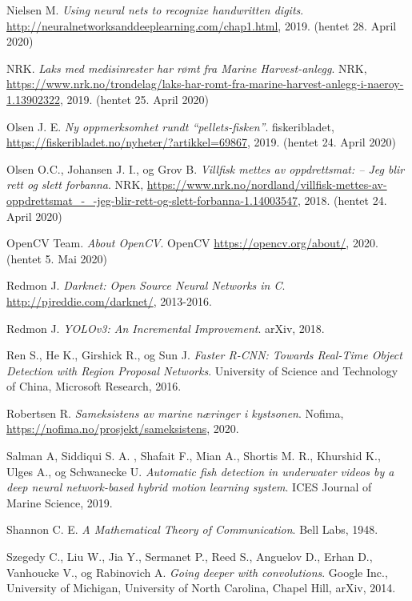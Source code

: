 \documentclass[11ot]{article}
\begin{document}
\begin{thebibliography}{9}
Nielsen M. 
\textit{Using neural nets to recognize handwritten digits}. 
\url{http://neuralnetworksanddeeplearning.com/chap1.html}, 2019. (hentet 28. April 2020)

NRK. 
\textit{Laks med medisinrester har rømt fra Marine Harvest-anlegg}. 
NRK, \url{https://www.nrk.no/trondelag/laks-har-romt-fra-marine-harvest-anlegg-i-naeroy-1.13902322}, 2019. (hentet 25. April 2020)

Olsen J. E. 
\textit{Ny oppmerksomhet rundt “pellets-fisken”}. 
fiskeribladet, \url{https://fiskeribladet.no/nyheter/?artikkel=69867}, 2019. (hentet 24. April 2020)

Olsen O.C., Johansen J. I., og Grov B. 
\textit{Villfisk mettes av oppdrettsmat: – Jeg blir rett og slett forbanna}. 
NRK, \url{https://www.nrk.no/nordland/villfisk-mettes-av-oppdrettsmat_-_-jeg-blir-rett-og-slett-forbanna-1.14003547}, 2018. (hentet 24. April 2020)

OpenCV Team. 
\textit{About OpenCV}. 
OpenCV \url{https://opencv.org/about/}, 2020. (hentet 5. Mai 2020)

Redmon J. 
\textit{Darknet: Open Source Neural Networks in C}. 
\url{http://pjreddie.com/darknet/}, 2013-2016.

Redmon J. 
\textit{YOLOv3: An Incremental Improvement}. 
arXiv, 2018.

Ren S., He K., Girshick R., og Sun J.
\textit{Faster R-CNN: Towards Real-Time Object Detection with Region Proposal Networks}. 
University of Science and Technology of China, Microsoft Research, 2016.

Robertsen R. 
\textit{Sameksistens av marine næringer i kystsonen}. 
Nofima, \url{https://nofima.no/prosjekt/sameksistens}, 2020.

Salman A, Siddiqui S. A. , Shafait F., Mian A., Shortis M. R., Khurshid K., Ulges A., og Schwanecke U. 
\textit{Automatic fish detection in underwater videos by a deep neural network-based hybrid motion learning system}. 
ICES Journal of Marine Science, 2019.

Shannon C. E. 
\textit{A Mathematical Theory of Communication}. 
Bell Labs, 1948.

Szegedy C., Liu W., Jia Y., Sermanet P., Reed S., Anguelov D., Erhan D., Vanhoucke V., og Rabinovich A. 
\textit{Going deeper with convolutions}. 
Google Inc., University of Michigan, University of North Carolina, Chapel Hill, arXiv, 2014.


\end{thebibliography}
\end{document}
